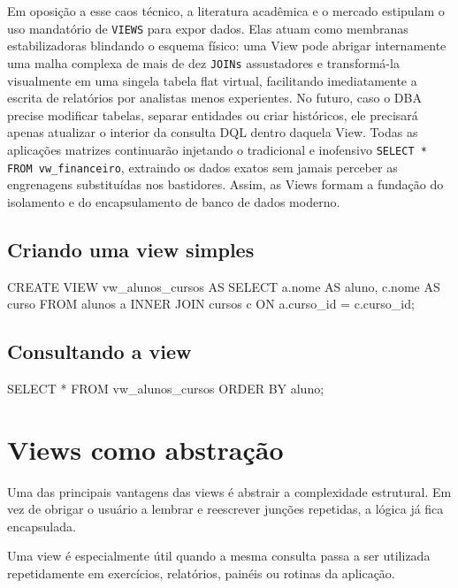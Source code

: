 Em oposição a esse caos técnico, a literatura acadêmica e o mercado estipulam o uso mandatório de \texttt{VIEWS} para expor dados. Elas atuam como membranas estabilizadoras blindando o esquema físico: uma View pode abrigar internamente uma malha complexa de mais de dez \texttt{JOINs} assustadores e transformá-la visualmente em uma singela tabela flat virtual, facilitando imediatamente a escrita de relatórios por analistas menos experientes. No futuro, caso o DBA precise modificar tabelas, separar entidades ou criar históricos, ele precisará apenas atualizar o interior da consulta DQL dentro daquela View. Todas as aplicações matrizes continuarão injetando o tradicional e inofensivo \texttt{SELECT * FROM vw\_financeiro}, extraindo os dados exatos sem jamais perceber as engrenagens substituídas nos bastidores. Assim, as Views formam a fundação do isolamento e do encapsulamento de banco de dados moderno.

\subsection{Criando uma view simples}

\begin{sqlcode}
CREATE VIEW vw_alunos_cursos AS
SELECT
    a.nome AS aluno,
    c.nome AS curso
FROM alunos a
INNER JOIN cursos c
    ON a.curso_id = c.curso_id;
\end{sqlcode}

\subsection{Consultando a view}

\begin{sqlcode}
SELECT *
FROM vw_alunos_cursos
ORDER BY aluno;
\end{sqlcode}

\section{Views como abstração}

Uma das principais vantagens das views é abstrair a complexidade estrutural. Em vez de obrigar o usuário a lembrar e reescrever junções repetidas, a lógica já fica encapsulada.

\begin{observacao}
Uma view é especialmente útil quando a mesma consulta passa a ser utilizada repetidamente em exercícios, relatórios, painéis ou rotinas da aplicação.
\end{observacao}

